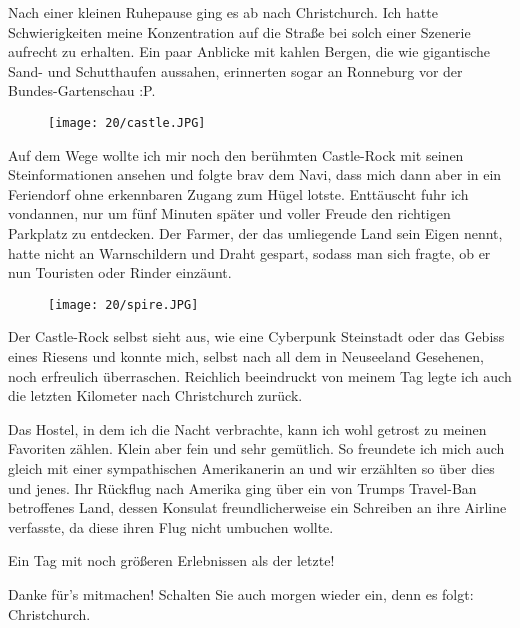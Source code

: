 Nach einer kleinen Ruhepause ging es ab nach Christchurch. Ich hatte
Schwierigkeiten meine Konzentration auf die Straße bei solch einer
Szenerie aufrecht zu erhalten. Ein paar Anblicke mit kahlen Bergen, die
wie gigantische Sand- und Schutthaufen aussahen, erinnerten sogar an
Ronneburg vor der Bundes-Gartenschau :P.

\begin{figure}[h]
  \centering
  \texttt{[image: 20/castle.JPG]}
\end{figure}
Auf dem Wege wollte ich mir noch den berühmten Castle-Rock mit seinen
Steinformationen ansehen und folgte brav dem Navi, dass mich dann aber
in ein Feriendorf ohne erkennbaren Zugang zum Hügel lotste. Enttäuscht
fuhr ich vondannen, nur um fünf Minuten später und voller Freude den
richtigen Parkplatz zu entdecken. Der Farmer, der das umliegende Land
sein Eigen nennt, hatte nicht an Warnschildern und Draht gespart, sodass
man sich fragte, ob er nun Touristen oder Rinder einzäunt.

\begin{figure}[h]
  \centering
  \texttt{[image: 20/spire.JPG]}
\end{figure}
Der Castle-Rock selbst sieht aus, wie eine Cyberpunk Steinstadt oder das
Gebiss eines Riesens und konnte mich, selbst nach all dem in Neuseeland
Gesehenen, noch erfreulich überraschen. Reichlich beeindruckt von meinem
Tag legte ich auch die letzten Kilometer nach Christchurch zurück.

Das Hostel, in dem ich die Nacht verbrachte, kann ich wohl getrost zu
meinen Favoriten zählen. Klein aber fein und sehr gemütlich. So
freundete ich mich auch gleich mit einer sympathischen Amerikanerin an
und wir erzählten so über dies und jenes. Ihr Rückflug nach Amerika ging
über ein von Trumps Travel-Ban betroffenes Land, dessen Konsulat
freundlicherweise ein Schreiben an ihre Airline verfasste, da diese
ihren Flug nicht umbuchen wollte.

Ein Tag mit noch größeren Erlebnissen als der letzte!

Danke für's mitmachen! Schalten Sie auch morgen wieder ein, denn es
folgt: Christchurch.
